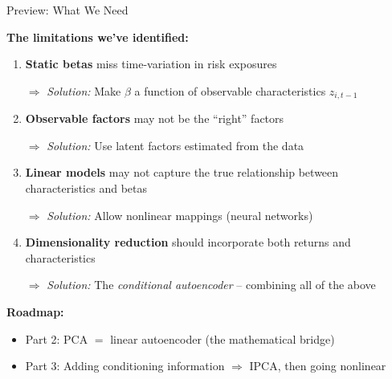 \documentclass[aspectratio=169]{beamer}
\begin{document}
\begin{frame}{Preview: What We Need}

\textbf{The limitations we've identified:}

\vspace{0.5em}
\begin{enumerate}
    \item \textbf{Static betas} miss time-variation in risk exposures
    
    $\Rightarrow$ \textit{Solution:} Make $\beta$ a function of observable characteristics $z_{i,t-1}$
    
    \vspace{0.3em}
    \item \textbf{Observable factors} may not be the ``right'' factors
    
    $\Rightarrow$ \textit{Solution:} Use latent factors estimated from the data
    
    \vspace{0.3em}
    \item \textbf{Linear models} may not capture the true relationship between characteristics and betas
    
    $\Rightarrow$ \textit{Solution:} Allow nonlinear mappings (neural networks)
    
    \vspace{0.3em}
    \item \textbf{Dimensionality reduction} should incorporate both returns and characteristics
    
    $\Rightarrow$ \textit{Solution:} The \emph{conditional autoencoder} -- combining all of the above
\end{enumerate}

\vspace{0.5em}
\textbf{Roadmap:}
\begin{itemize}
    \item Part 2: PCA $=$ linear autoencoder (the mathematical bridge)
    \item Part 3: Adding conditioning information $\Rightarrow$ IPCA, then going nonlinear
\end{itemize}
\end{frame}
%
%
\end{document}
